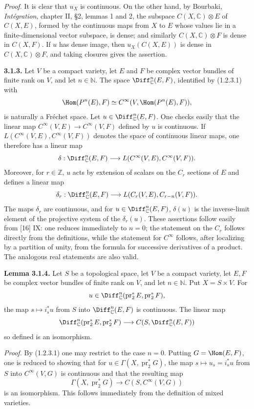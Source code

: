 \emph{Proof.} It is clear that $u_X$ is continuous. On the other hand, by Bourbaki, \emph{Intégration}, chapter II, §2, lemmas 1 and 2, the subspace $C(X,\mathbb C)\otimes E$ of $C(X,E)$, formed by the continuous maps from $X$ to $E$ whose values lie in a finite-dimensional vector subspace, is dense; and similarly $C(X,\mathbb C)\otimes F$ is dense in $C(X,F)$. If $u$ has dense image, then $u_X(C(X,E))$ is dense in $C(X,\mathbb C)\otimes F$, and taking closures gives the assertion.

\textbf{3.1.3.} Let $V$ be a compact variety, let $E$ and $F$ be complex vector bundles of finite rank on $V$, and let $n\in\mathbb N$. The space $\Diff^n_{\mathbb C}(E,F)$, identified by (1.2.3.1) with
\[
 \Hom(P^n(E),F)\simeq C^\infty(V,\Hom(P^n(E),F)),
\]
is naturally a Fréchet space. Let $u\in\Diff^n_{\mathbb C}(E,F)$. One checks easily that the linear map $C^\infty(V,E)\to C^\infty(V,F)$ defined by $u$ is continuous. If $L(C^\infty(V,E),C^\infty(V,F))$ denotes the space of continuous linear maps, one therefore has a linear map
\[
 \delta:\Diff^n_{\mathbb C}(E,F)
 \longrightarrow L(C^\infty(V,E),C^\infty(V,F)).
\]
Moreover, for $r\in\mathbb Z$, $u$ acts by extension of scalars on the $C_r$ sections of $E$ and defines a linear map
\[
 \delta_r:\Diff^n_{\mathbb C}(E,F)
 \longrightarrow L(C_r(V,E),C_{r-n}(V,F)).
\]
The maps $\delta_r$ are continuous, and for $u\in\Diff^n_{\mathbb C}(E,F)$, $\delta(u)$ is the inverse-limit element of the projective system of the $\delta_r(u)$. These assertions follow easily from [16] IX: one reduces immediately to $n=0$; the statement on the $C_r$ follows directly from the definitions, while the statement for $C^\infty$ follows, after localizing by a partition of unity, from the formula for successive derivatives of a product. The analogous real statements are also valid.

\textbf{Lemma 3.1.4.} Let $S$ be a topological space, let $V$ be a compact variety, let $E,F$ be complex vector bundles of finite rank on $V$, and let $n\in\mathbb N$. Put $X=S\times V$. For
\[
 u\in\Diff^n_{\mathbb C}(\operatorname{pr}_2^*E,\operatorname{pr}_2^*F),
\]
the map $s\mapsto i_s^*u$ from $S$ into $\Diff^n_{\mathbb C}(E,F)$ is continuous. The linear map
\[
 \Diff^n_{\mathbb C}(\operatorname{pr}_2^*E,\operatorname{pr}_2^*F)
 \longrightarrow C(S,\Diff^n_{\mathbb C}(E,F))
\]
so defined is an isomorphism.

\emph{Proof.} By (1.2.3.1) one may restrict to the case $n=0$. Putting $G=\Hom(E,F)$, one is reduced to showing that for $u\in\Gamma(X,\operatorname{pr}_2^*G)$, the map $s\mapsto u_s=i_s^*u$ from $S$ into $C^\infty(V,G)$ is continuous and that the resulting map
\[
 \Gamma(X,\operatorname{pr}_2^*G)\longrightarrow C(S,C^\infty(V,G))
\]
is an isomorphism. This follows immediately from the definition of mixed varieties.

